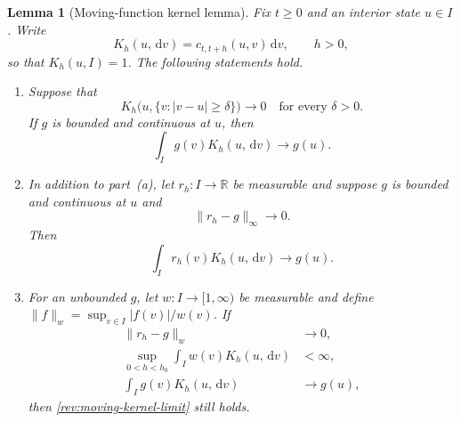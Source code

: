 \documentclass[11pt]{article}
\newtheorem{lemma}[definition]{Lemma}
\theoremstyle{remark}
\newcommand{\R}{\mathbb R}
\newcommand{\dd}{\,\mathrm d}
\begin{document}
\begin{lemma}[Moving-function kernel lemma]
\label{rev:app-kernel-lemma}
Fix $t\ge0$ and an interior state $u\in I$.  Write
\[
K_h(u,\dd v)=c_{t,t+h}(u,v)\dd v,
\qquad h>0,
\]
so that $K_h(u,I)=1$.  The following statements hold.
\begin{enumerate}[label=(\alph*)]
\item Suppose that
\begin{equation}
K_h\bigl(u,\{v:|v-u|\ge\delta\}\bigr)\longrightarrow0
\quad\text{for every }\delta>0.
\label{rev:kernel-stochastic-continuity}
\end{equation}
If $g$ is bounded and continuous at $u$, then
\begin{equation}
\int_Ig(v)K_h(u,\dd v)\longrightarrow g(u).
\label{rev:kernel-fixed-function-limit}
\end{equation}
\item In addition to part~(a), let $r_h:I\to\R$ be measurable and suppose
$g$ is bounded and continuous at $u$ and
\begin{equation}
\lVert r_h-g\rVert_\infty\longrightarrow0.
\label{rev:moving-uniform-limit}
\end{equation}
Then
\begin{equation}
\int_Ir_h(v)K_h(u,\dd v)\longrightarrow g(u).
\label{rev:moving-kernel-limit}
\end{equation}
\item For an unbounded $g$, let $w:I\to[1,\infty)$ be measurable and define
$\lVert f\rVert_w=\sup_{v\in I}|f(v)|/w(v)$.  If
\begin{align}
\lVert r_h-g\rVert_w&\longrightarrow0,
\label{rev:moving-weighted-limit}\\
\sup_{0<h<h_0}\int_Iw(v)K_h(u,\dd v)&<\infty,
\label{rev:kernel-weight-bound}\\
\int_Ig(v)K_h(u,\dd v)&\longrightarrow g(u),
\label{rev:weighted-strong-continuity}
\end{align}
then \eqref{rev:moving-kernel-limit} still holds.
\end{enumerate}
\end{lemma}
\end{document}
